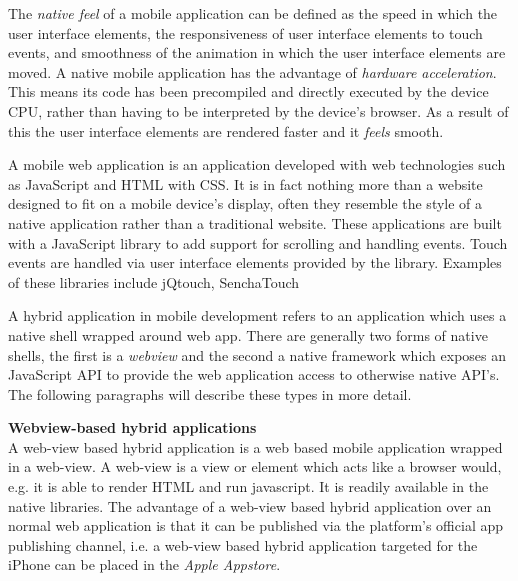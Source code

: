 
The \emph{native feel} of a mobile application can be defined as the speed in which the user interface elements, the responsiveness of user interface elements to touch events, and smoothness of the animation in which the user interface elements are moved. A native mobile application has the advantage of \emph{hardware acceleration}. This means its code has been precompiled and directly executed by the device CPU, rather than having to be interpreted by the device's browser. As a result of this the user interface elements are rendered faster and it \emph{feels} smooth.


A mobile web application is an application developed with web technologies such as JavaScript and HTML with CSS. It is in fact nothing more than a website designed to fit on a mobile device's display, often they resemble the style of a native application rather than a traditional website. These applications are built with a JavaScript library to add support for scrolling and handling events. Touch events are handled via user interface elements provided by the library. Examples of these libraries include jQtouch, SenchaTouch


A hybrid application in mobile development refers to an application which uses a native shell wrapped around web app. There are generally two forms of native shells, the first is a \emph{webview} and the second a native framework which exposes an JavaScript API to provide the web application access to otherwise native API's. The following paragraphs will describe these types in more detail.

{\bf Webview-based hybrid applications}\\
A web-view based hybrid application is a web based mobile application wrapped in a web-view. A web-view is a view or element which acts like a browser would, e.g. it is able to render HTML and run javascript.  It is readily available in the native libraries. The advantage of a web-view based hybrid application over an normal web application is that it can be published via the platform's official app publishing channel, i.e. a web-view based hybrid application targeted for the iPhone can be placed in the \emph{Apple Appstore}. 

